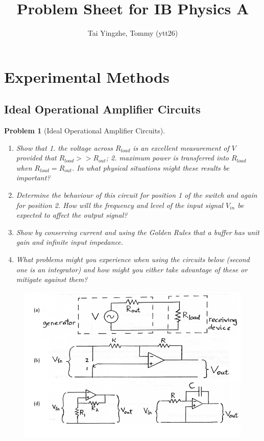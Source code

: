 \documentclass[a4paper]{article}
\title{\textbf{Problem Sheet for IB Physics A}}
\author{Tai Yingzhe, Tommy (ytt26)}
\date{}
\theoremstyle{new}
\newtheorem{qns}{Problem}[section]
\begin{document}
\maketitle
\tableofcontents
\newpage
\section{Experimental Methods}
\subsection{Ideal Operational Amplifier Circuits}
\begin{qns}[Ideal Operational Amplifier Circuits]\leavevmode
\begin{enumerate}[label=(\alph*)]
\item Show that 1. the voltage across $R_{load}$ is an excellent measurement of $V$ provided that $R_{load}>>R_{out}$; 2. maximum power is transferred into $R_{load}$ when $R_{load}=R_{out}$. In what physical situations might these results be important?
\item Determine the behaviour of this circuit for position 1 of the switch and again for position 2. How will the frequency and level of the input signal $V_{in}$ be expected to affect the output signal?
\item Show by conserving current and using the Golden Rules that a buffer has unit gain and infinite input impedance. 
\item What problems might you experience when using the circuits below (second one is an integrator) and how might you either take advantage of these or mitigate against them?
\end{enumerate}
\end{qns}
\begin{figure}[H]
    \centering
    \includegraphics[scale=0.45]{1_1.PNG}
\end{figure}
\end{document}
